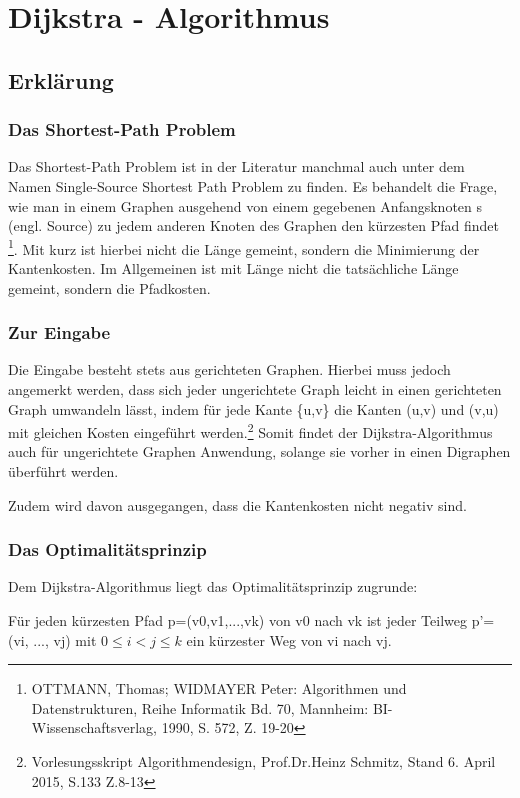 \chapter{Dijkstra - Algorithmus}

\section{Erklärung}

\subsection{Das Shortest-Path Problem}
Das Shortest-Path Problem ist in der Literatur manchmal auch unter dem Namen Single-Source Shortest Path Problem zu finden. 
Es behandelt die Frage, wie man in einem Graphen ausgehend von einem gegebenen Anfangsknoten s (engl. Source) zu jedem anderen Knoten des Graphen den kürzesten Pfad findet \footnote{OTTMANN, Thomas; WIDMAYER Peter: Algorithmen und Datenstrukturen, Reihe Informatik Bd. 70, Mannheim: BI-Wissenschaftsverlag, 1990, S. 572, Z. 19-20}. Mit kurz ist hierbei nicht die Länge gemeint, sondern die Minimierung der Kantenkosten. Im Allgemeinen ist mit Länge nicht die tatsächliche Länge gemeint, sondern die Pfadkosten.


\subsection{Zur Eingabe}
Die Eingabe besteht stets aus gerichteten Graphen. Hierbei muss jedoch angemerkt werden, dass sich jeder ungerichtete Graph leicht in einen gerichteten Graph umwandeln lässt, indem für jede Kante \{u,v\} die Kanten (u,v) und (v,u) mit gleichen Kosten eingeführt werden.\footnote{Vorlesungsskript Algorithmendesign, Prof.Dr.Heinz Schmitz, Stand 6. April 2015, S.133 Z.8-13} Somit findet der Dijkstra-Algorithmus auch für ungerichtete Graphen Anwendung, solange sie vorher in einen Digraphen überführt werden. 

\parindent0pt Zudem wird davon ausgegangen, dass die Kantenkosten nicht negativ sind.

\subsection{Das Optimalitätsprinzip}
Dem Dijkstra-Algorithmus liegt das Optimalitätsprinzip zugrunde:

\parindent0pt Für jeden kürzesten Pfad p=(v{\tiny 0},v{\tiny 1},...,v{\tiny k}) von v{\tiny 0} nach v{\tiny k} ist jeder Teilweg p'=(v{\tiny i}, ..., v{\tiny j}) mit $0 \le i < j \le k$ ein kürzester Weg von v{\tiny i} nach v{\tiny j}.

